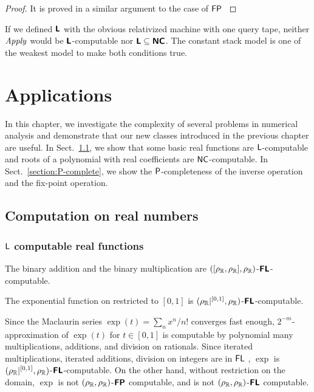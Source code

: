 \documentclass[envcountsame,orivec,oribibl]{llncs}
\begin{document}
\begin{proof}
 It is proved in a similar argument to the case of $\mathsf{FP}$ \cite{kawamura11:_funct_space_repres_and_polyn_time_comput}
\end{proof}


If we defined $\text{\bfseries \sffamily \upshape L}$ with the obvious relativized machine with one query tape,
neither $\mathit{Apply}$ would be $\text{\bfseries \sffamily \upshape L}$-computable 
nor $\text{\bfseries \sffamily \upshape L} \subseteq \text{\bfseries \sffamily \upshape NC}$.
The constant stack model is one of the weakest model to make both conditions
true.


\section{Applications}
\label{chapter:applications}
In this chapter, we investigate the complexity of several problems in numerical
analysis and demonstrate that our new classes introduced in the previous
chapter are useful.
In Sect.~\ref{section:function}, 
we show that some basic real functions are $\mathsf{L}$-computable and
roots of a polynomial with real coefficients are $\mathsf{NC}$-computable.
In Sect.~\ref{section:P-complete}, we show the $\mathsf{P}$-completeness of 
the inverse operation and the fix-point operation.

\subsection{Computation on real numbers}
\label{section:function}

\subsubsection{$\mathsf{L}$ computable real functions}

\begin{example}
 The binary addition and the binary multiplication are
 $([\rho _\mathbb R, \rho _\mathbb R], \rho _\mathbb R)$-$\text{\bfseries \sffamily \upshape FL}$-computable.
\end{example}

\begin{lemma}
 The exponential function on restricted to $[0,1]$
 is $(\rho _\mathbb R|^{[0,1]}, \rho _\mathbb R)$-$\text{\bfseries \sffamily \upshape FL}$-computable.
\end{lemma}
Since the Maclaurin series $\exp(t) = \sum_n x^n / n!$ converges fast enough,
$2^{-m}$-approximation of $\exp(t)$ for $t \in [0,1]$ is computable 
by polynomial many multiplications, additions, and division on rationals.
Since iterated multiplications, iterated additions, division on integers
are in $\mathsf{FL}$ \cite{chiu2001division},
$\exp$ is $(\rho _\mathbb R|^{[0,1]}, \rho _\mathbb R)$-$\text{\bfseries \sffamily \upshape FL}$-computable.
On the other hand, without restriction on the domain, $\exp$ is not 
$(\rho _\mathbb R, \rho _\mathbb R)$-$\text{\bfseries \sffamily \upshape FP}$ computable, 
and is not $(\rho _\mathbb R, \rho _\mathbb R)$-$\text{\bfseries \sffamily \upshape FL}$ computable.
\end{document}
